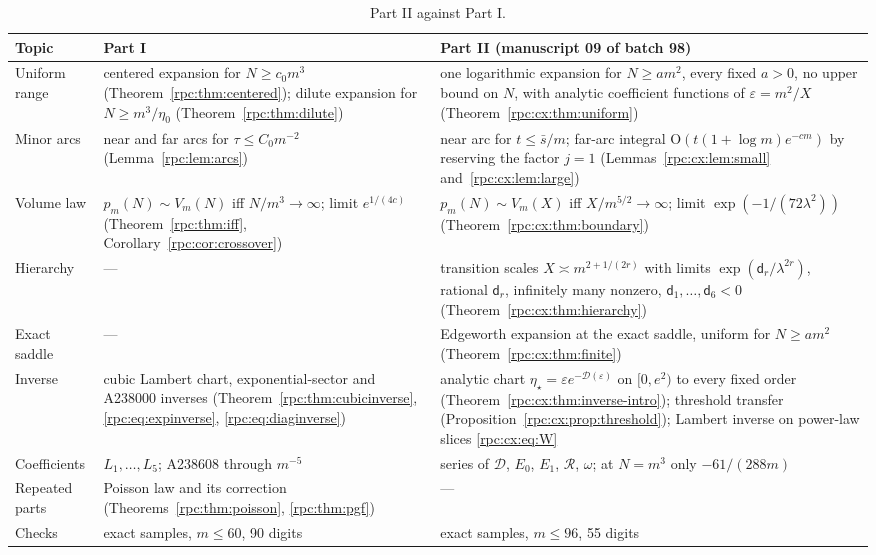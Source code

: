 \documentclass[11pt]{article}
\theoremstyle{definition}
\theoremstyle{remark}
\numberwithin{equation}{section}
\begin{document}
\begin{table}[htbp]
\centering\small
\renewcommand{\arraystretch}{1.15}
\begin{tabular}{@{}>{\raggedright\arraybackslash}p{}>{\raggedright\arraybackslash}p{}>{\raggedright\arraybackslash}p{}@{}}
\toprule
Topic & Part I & Part II (manuscript 09 of batch 98)\\
\midrule
Uniform range &
centered expansion for $N\ge c_0m^3$ (Theorem~\ref{rpc:thm:centered});
dilute expansion for $N\ge m^3/\eta_0$ (Theorem~\ref{rpc:thm:dilute}) &
one logarithmic expansion for $N\ge am^2$, every fixed $a>0$, no upper bound
on $N$, with analytic coefficient functions of $\varepsilon=m^2/X$
(Theorem~\ref{rpc:cx:thm:uniform})\\
Minor arcs &
near and far arcs for $\tau\le C_0m^{-2}$ (Lemma~\ref{rpc:lem:arcs}) &
near arc for $t\le\bar s/m$; far-arc integral
$\mathrm O(t(1+\log m)e^{-cm})$ by reserving the factor $j=1$
(Lemmas~\ref{rpc:cx:lem:small} and~\ref{rpc:cx:lem:large})\\
Volume law &
$p_m(N)\sim V_m(N)$ iff $N/m^3\to\infty$; limit $e^{1/(4c)}$
(Theorem~\ref{rpc:thm:iff}, Corollary~\ref{rpc:cor:crossover}) &
$p_m(N)\sim V_m(X)$ iff $X/m^{5/2}\to\infty$; limit
$\exp(-1/(72\lambda^2))$ (Theorem~\ref{rpc:cx:thm:boundary})\\
Hierarchy &
--- &
transition scales $X\asymp m^{2+1/(2r)}$ with limits
$\exp(\mathsf d_r/\lambda^{2r})$, rational $\mathsf d_r$, infinitely many
nonzero, $\mathsf d_1,\ldots,\mathsf d_6<0$ (Theorem~\ref{rpc:cx:thm:hierarchy})\\
Exact saddle &
--- &
Edgeworth expansion at the exact saddle, uniform for $N\ge am^2$
(Theorem~\ref{rpc:cx:thm:finite})\\
Inverse &
cubic Lambert chart, exponential-sector and A238000 inverses
(Theorem~\ref{rpc:thm:cubicinverse}, \eqref{rpc:eq:expinverse},
\eqref{rpc:eq:diaginverse}) &
analytic chart $\eta_\star=\varepsilon e^{-\mathcal D(\varepsilon)}$ on
$[0,e^2)$ to every fixed order (Theorem~\ref{rpc:cx:thm:inverse-intro});
threshold transfer (Proposition~\ref{rpc:cx:prop:threshold}); Lambert
inverse on power-law slices \eqref{rpc:cx:eq:W}\\
Coefficients &
$L_1,\ldots,L_5$; A238608 through $m^{-5}$ &
series of $\mathcal D$, $E_0$, $E_1$, $\mathcal R$, $\omega$; at $N=m^3$ only
$-61/(288m)$\\
Repeated parts &
Poisson law and its correction (Theorems~\ref{rpc:thm:poisson},
\ref{rpc:thm:pgf}) &
---\\
Checks &
258 exact samples, $m\le60$, 90 digits &
46 exact samples, $m\le96$, 55 digits\\
\bottomrule
\end{tabular}
\caption{Part II against Part I.}
\label{rpc:cx:tab:claims}
\end{table}
\end{document}

